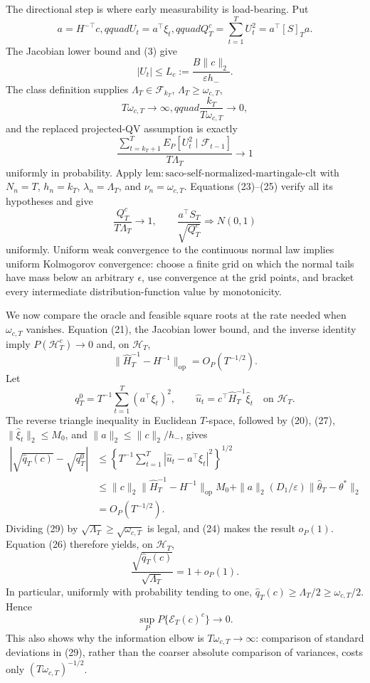 The directional step is where early measurability is load-bearing. Put
\[
 a=H^{-\top}c,qquad U_t=a^\top\xi_t,qquad
 Q_T^c=\sum_{t=1}^TU_t^2=a^\top[S]_Ta.
\tag{22}
\]
The Jacobian lower bound and (3) give
\[
 |U_t|\le L_c:=\frac{B\|c\|_2}{\varepsilon h_-}.
\tag{23}
\]
The class definition supplies \(\Lambda_T\in\mathcal F_{k_T}\), \(\Lambda_T\ge\omega_{c,T}\),
\[
 T\omega_{c,T}\to\infty,qquad
 \frac{k_T}{T\omega_{c,T}}\to0,
\tag{24}
\]
and the replaced projected-QV assumption is exactly
\[
 \frac{\sum_{t=k_T+1}^TE_P[U_t^2\mid\mathcal F_{t-1}]}
 {T\Lambda_T}\longrightarrow1
\tag{25}
\]
uniformly in probability. Apply \(\mathrm{lem:saco\text{-}self\text{-}normalized\text{-}martingale\text{-}clt}\) with \(N_n=T\), \(h_n=k_T\), \(\lambda_n=\Lambda_T\), and \(\nu_n=\omega_{c,T}\). Equations (23)--(25) verify all its hypotheses and give
\[
 \frac{Q_T^c}{T\Lambda_T}\longrightarrow1,
 \qquad \frac{a^\top S_T}{\sqrt{Q_T^c}}\Rightarrow N(0,1)
\tag{26}
\]
uniformly. Uniform weak convergence to the continuous normal law implies uniform Kolmogorov convergence: choose a finite grid on which the normal tails have mass below an arbitrary \(\epsilon\), use convergence at the grid points, and bracket every intermediate distribution-function value by monotonicity.

We now compare the oracle and feasible square roots at the rate needed when \(\omega_{c,T}\) vanishes. Equation (21), the Jacobian lower bound, and the inverse identity imply \(P(\mathcal H_T^c)\to0\) and, on \(\mathcal H_T\),
\[
 \|\widehat H_T^{-1}-H^{-1}\|_{\mathrm{op}}=O_P(T^{-1/2}).
\tag{27}
\]
Let
\[
 q_T^0=T^{-1}\sum_{t=1}^T(a^\top\xi_t)^2,
 \qquad \widehat u_t=c^\top\widehat H_T^{-1}\widehat\xi_t
 \quad\text{on }\mathcal H_T.
\tag{28}
\]
The reverse triangle inequality in Euclidean \(T\)-space, followed by (20), (27), \(\|\widehat\xi_t\|_2\le M_0\), and \(\|a\|_2\le\|c\|_2/h_-\), gives
\[
 \begin{aligned}
 \left|\sqrt{\widehat q_T(c)}-\sqrt{q_T^0}\right|
 &\le\left\{T^{-1}\sum_{t=1}^T
 |\widehat u_t-a^\top\xi_t|^2\right\}^{1/2}\\
 &\le \|c\|_2\|\widehat H_T^{-1}-H^{-1}\|_{\mathrm{op}}M_0
 +\|a\|_2(D_1/\varepsilon)\|\widehat\theta_T-\theta^*\|_2\\
 &=O_P(T^{-1/2}).
 \end{aligned}
\tag{29}
\]
Dividing (29) by \(\sqrt{\Lambda_T}\ge\sqrt{\omega_{c,T}}\) is legal, and (24) makes the result \(o_P(1)\). Equation (26) therefore yields, on \(\mathcal H_T\),
\[
 \frac{\sqrt{\widehat q_T(c)}}{\sqrt{\Lambda_T}}
 =1+o_P(1).
\tag{30}
\]
In particular, uniformly with probability tending to one, \(\widehat q_T(c)\ge\Lambda_T/2\ge\omega_{c,T}/2\). Hence
\[
 \sup_P P\{\mathcal E_T(c)^c\}\longrightarrow0.
\tag{31}
\]
This also shows why the information elbow is \(T\omega_{c,T}\to\infty\): comparison of standard deviations in (29), rather than the coarser absolute comparison of variances, costs only \((T\omega_{c,T})^{-1/2}\).

